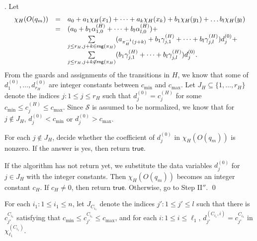 \documentclass[runningheads,a4paper]{llncs}
\def\Ss{{\mathcal{S} }}
\newcommand\rng{\mathsf{rng}}
\newcommand\ltrue{\mathsf{true}}
\begin{document}
\smallskip

. Let
\[
\begin{array}{l c l }
\chi_H(O(q_m)) & = & a_0 + a_1 \chi_H(x_1) + \dots + a_k \chi_H(x_k) + b_1 \chi_H(y_1) + \dots b_l \chi_H(y_l) \\
& = & (a_0+b_1 \alpha^{(H)}_{1,0} + \dots + b_l \alpha^{(H)}_{l,0}) + \\
& & \sum \limits_{j \le r_H, j+k \in \rng(\pi_H)} (a_{\pi_H^{-1}(j+k)}+ b_1 \gamma^{(H)}_{j,1}+\dots + b_l \gamma^{(H)}_{j,l}) d^{(0)}_j +
\\
& & \sum \limits_{j \le r_H, j +k \not \in \rng(\pi_H)}  (b_1 \gamma^{(H)}_{j,1}+\dots + b_l \gamma^{(H)}_{j,l}) d^{(0)}_j .
\end{array}
\]
From the guards and assignments of the transitions in $H$, we know that some of $d^{(0)}_1,\dots,d^{(0)}_{r_H}$ are integer constants between $c_{\min}$ and $c_{\max}$. Let $J_H \subseteq \{1,\dots, r_H\}$ denote the indices $j: 1 \le j \le r_H$ such that $d^{(0)}_j = c^{(H)}_j$ for some $c_{\min}\le c^{(H)}_j \le c_{\max}$. Since $\Ss$ is assumed to be normalized, we know that for $j \not \in J_H$,  $d^{(0)}_j < c_{\min}$ or $d^{(0)}_j > c_{\max}$.

For each $j \not \in J_H$, decide whether the coefficient of $d^{(0)}_j$ in $\chi_H(O(q_m))$ is nonzero. If the answer is yes, then return $\ltrue$. 

If the algorithm has not return yet, we substitute the data variables $d^{(0)}_j$ for $j \in J_H$ with the integer constants. Then $\chi_H(O(q_m))$ becomes an integer constant $c_H$. If $c_H \neq 0$, then return $\ltrue$.  Otherwise, go to Step II$''$. \qed

\medskip

For each $i_1: 1 \le i_1 \le n$, let $J_{C_{i_1}}$ denote the indices $j': 1 \le j' \le l$ such that there is $c^{C_{i_1}}_{j'}$ satisfying that $c_{\min} \le c^{C_{i_1}}_{j'} \le c_{\max}$, and for each $i: 1 \le i \le \ell_1$, $d^{(C_{i_1},i)}_{j'}=c^{C_{i_1}}_{j'}$ in $\chi^{(C_{i_1})}_{\ell_1}$. 
\end{document}

